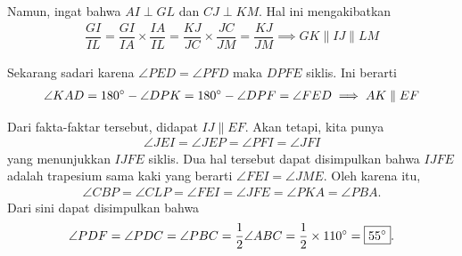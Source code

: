 Namun, ingat bahwa $AI \perp GL$ dan $CJ \perp KM$. Hal ini mengakibatkan
\begin{align*}
    \dfrac{GI}{IL} = \dfrac{GI}{IA} \times \dfrac{IA}{IL} = \dfrac{KJ}{JC} \times \dfrac{JC}{JM} = \dfrac{KJ}{JM} \implies GK \parallel IJ \parallel LM
\end{align*}

Sekarang sadari karena $\angle PED = \angle PFD$ maka $DPFE$ siklis. Ini berarti
\begin{align*}
    \angle KAD = 180^\circ - \angle DPK = 180^\circ - \angle DPF = \angle FED \implies AK \parallel EF
\end{align*}

Dari fakta-faktar tersebut, didapat $IJ \parallel EF$. Akan tetapi, kita punya
\begin{align*}
    \angle JEI = \angle JEP = \angle PFI = \angle JFI 
\end{align*}
yang menunjukkan $IJFE$ siklis. Dua hal tersebut dapat disimpulkan bahwa $IJFE$ adalah trapesium sama kaki yang berarti $\angle FEI = \angle JME$. Oleh karena itu,
\begin{align*}
    \angle CBP = \angle CLP = \angle  FEI = \angle JFE = \angle PKA = \angle PBA.
\end{align*}
Dari sini dapat disimpulkan bahwa
\begin{align*}
    \angle PDF = \angle PDC = \angle PBC = \frac{1}{2}\angle ABC = \frac{1}{2} \times 110^\circ = \boxed{55 ^\circ}.
\end{align*}